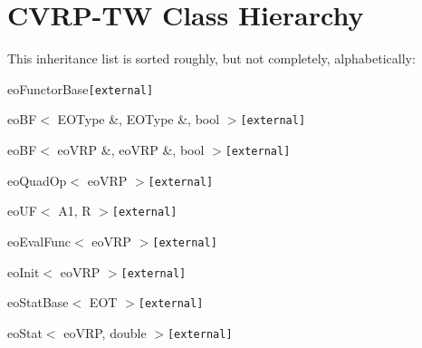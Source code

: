 \section{CVRP-TW Class Hierarchy}
This inheritance list is sorted roughly, but not completely, alphabetically:\begin{CompactList}
\item {}
\item eo\-Functor\-Base{\tt  [external]}\begin{CompactList}
\item eo\-BF$<$ EOType \&, EOType \&, bool $>${\tt  [external]}\item eo\-BF$<$ eo\-VRP \&, eo\-VRP \&, bool $>${\tt  [external]}\begin{CompactList}
\item eo\-Quad\-Op$<$ eo\-VRP $>${\tt  [external]}\begin{CompactList}
\item {}
\item {}
\item {}
\end{CompactList}
\end{CompactList}
\item eo\-UF$<$ A1, R $>${\tt  [external]}\begin{CompactList}
\item eo\-Eval\-Func$<$ eo\-VRP $>${\tt  [external]}\begin{CompactList}
\item {}
\end{CompactList}
\item eo\-Init$<$ eo\-VRP $>${\tt  [external]}\begin{CompactList}
\item {}
\end{CompactList}
\item eo\-Stat\-Base$<$ EOT $>${\tt  [external]}\begin{CompactList}
\item eo\-Stat$<$ eo\-VRP, double $>${\tt  [external]}\begin{CompactList}

\end{CompactList}
\end{CompactList}
\end{CompactList}
\end{CompactList}
\end{CompactList}
